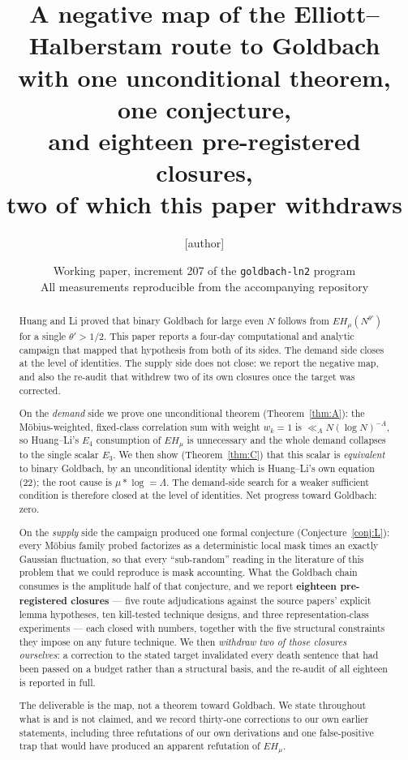 \documentclass[11pt,a4paper]{article}
\title{A negative map of the Elliott--Halberstam route to Goldbach\\
\large with one unconditional theorem, one conjecture,\\
and eighteen pre-registered closures,\\
two of which this paper withdraws}
\author{[author]}
\date{Working paper, increment 207 of the \texttt{goldbach-ln2}
program\\
\small All measurements reproducible from the accompanying repository}
\theoremstyle{plain}
\theoremstyle{definition}
\begin{document}
\maketitle

\begin{abstract}
Huang and Li proved that binary Goldbach for large even $N$ follows
from $EH_\mu(N^{\theta'})$ for a single $\theta' > 1/2$. This paper
reports a four-day computational and analytic campaign that mapped
that hypothesis from both of its sides. The demand side closes at the
level of identities. The supply side does not close: we report the
negative map, and also the re-audit that withdrew two of its own
closures once the target was corrected.

On the \emph{demand} side we prove one unconditional theorem
(Theorem~\ref{thm:A}): the M\"obius-weighted, fixed-class correlation
sum with weight $w_k = 1$ is $\ll_A N(\log N)^{-A}$, so Huang--Li's
$E_4$ consumption of $EH_\mu$ is unnecessary and the whole demand
collapses to the single scalar $E_3$. We then show
(Theorem~\ref{thm:C}) that this scalar is \emph{equivalent} to binary
Goldbach, by an unconditional identity which is Huang--Li's own
equation (22); the root cause is $\mu * \log = \Lambda$. The
demand-side search for a weaker sufficient condition is therefore
closed at the level of identities. Net progress toward Goldbach: zero.

On the \emph{supply} side the campaign produced one formal conjecture
(Conjecture~\ref{conj:L}): every M\"obius family probed factorizes as
a deterministic local mask times an exactly Gaussian fluctuation, so
that every ``sub-random'' reading in the literature of this problem
that we could reproduce is mask accounting. What the Goldbach chain
consumes is the amplitude half of that conjecture, and we report
\textbf{eighteen pre-registered closures} --- five route adjudications
against the source papers' explicit lemma hypotheses, ten
kill-tested technique designs, and three representation-class
experiments --- each closed with numbers, together with the five
structural constraints they impose on any future technique. We then
\emph{withdraw two of those closures ourselves}: a correction to the
stated target invalidated every death sentence that had been passed on
a budget rather than a structural basis, and the re-audit of all
eighteen is reported in full.

The deliverable is the map, not a theorem toward Goldbach. We state
throughout what is and is not claimed, and we record thirty-one
corrections to our own earlier statements, including three refutations
of our own derivations and one false-positive trap that would have
produced an apparent refutation of $EH_\mu$.
\end{abstract}
\end{document}
